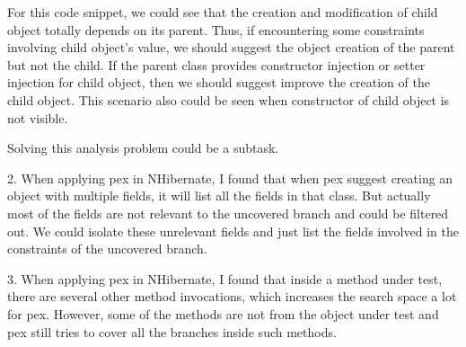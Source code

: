 For this code snippet, we could see that the creation and modification of child object totally depends on its parent. Thus, if encountering some constraints involving child object's value, we should suggest the object creation of the parent but not the child. If the parent class provides constructor injection or setter injection for child object, then we should suggest improve the creation of the child object. This scenario also could be seen when constructor of child object is not visible.

Solving this analysis problem could be a subtask.

2. When applying pex in NHibernate, I found that when pex suggest creating an object with multiple fields, it will list all the fields in that class. But actually most of the fields are not relevant to the uncovered branch and could be filtered out. We could isolate these unrelevant fields and just list the fields involved in the constraints of the uncovered branch.

3. When applying pex in NHibernate, I found that inside a method under test, there are several other method invocations, which increases the search space a lot for pex. However, some of the methods are not from the object under test and pex still tries to cover all the branches inside such methods. 

